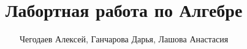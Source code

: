 

    
    \title{Лабортная работа по Алгебре}
    \author{Чегодаев Алексей, Ганчарова Дарья, Лашова Анастасия}

    \maketitle \newpage

    \tableofcontents \newpage


